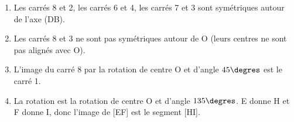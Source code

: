 	
%		
%		
%		
%		
%		
%		
%		
%		
%		
\medskip

	\begin{enumerate}
		\item %
Les carrés 8 et 2,  les carrés 6 et 4, les carrés 7 et 3 sont symétriques autour de l'axe (DB).	
		\item %
Les carrés 8 et 3 ne sont pas symétriques autour de O (leurs centres ne sont pas alignés avec O).		
		\item %
		
L'image du carré 8 par la rotation de centre O et d'angle $45\degres$ est le carré 1.
		
		\item %
		
La rotation est la rotation de centre O et d'angle $135\degres$. E donne H et F donne I, donc l'image de [EF] est le segment [HI].
	\end{enumerate}

\bigskip

